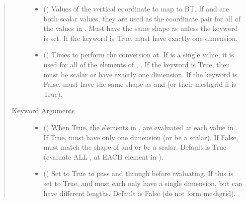 \documentclass[letterpaper,10pt,english]{sphinxmanual}
\begin{document}
\begin{fulllineitems}
\begin{fulllineitems}
\begin{quote}
\begin{description}
\begin{itemize}
\item {} 
 () \textendash{} Values of the vertical coordinate to
map to BT. If  and  are both scalar values,
they are used as the coordinate pair for all of the values in
. Must have the same shape as  unless the 
keyword is set. If the  keyword is True,  must
have exactly one dimension.

\item {} 
 () \textendash{} Times to perform the conversion at.
If  is a single value, it is used for all of the elements of
, . If the  keyword is True, then  must be
scalar or have exactly one dimension. If the  keyword is
False,  must have the same shape as  and  (or their
meshgrid if  is True).

\end{itemize}

\item[{Keyword Arguments}] \leavevmode\begin{itemize}
\item {} 
 () \textendash{} When True, the elements in ,  are evaluated
at each value in . If True,  must have only one dimension
(or be a scalar). If False,  must match the shape of  and
 or be a scalar. Default is True (evaluate ALL ,  at
EACH element in ).

\item {} 
 () \textendash{} Set to True to pass  and  through
 before evaluating. If this is set to
True,  and  must each only have a single dimension, but
can have different lengths. Default is False (do not form
meshgrid).


\end{itemize}
\end{description}
\end{quote}
\end{fulllineitems}
\end{fulllineitems}
\end{document}

